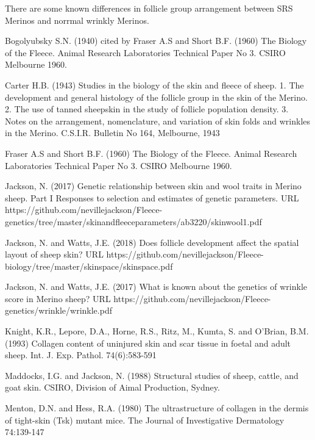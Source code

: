 \documentclass[titlepage]{article}  %
\begin{document}
There are some known differences in follicle group arrangement between SRS Merinos and norrmal wrinkly Merinos. 

\clearpage
\begin{thebibliography}{99}

 Bogolyubsky S.N. (1940) cited by Fraser A.S and Short B.F. (1960) The Biology of the Fleece. Animal Research Laboratories Technical Paper No 3. CSIRO Melbourne 1960.


Carter H.B. (1943) Studies in the biology of the skin and fleece of sheep. 1. The development and general histology of the follicle group in the skin of the Merino. 2. The use of tanned sheepskin in the study of follicle population density. 3. Notes on the arrangement, nomenclature, and variation of skin folds and wrinkles in the Merino. C.S.I.R. Bulletin No 164, Melbourne, 1943

Fraser A.S and Short B.F. (1960) The Biology of the Fleece. Animal Research Laboratories Technical Paper No 3. CSIRO Melbourne 1960.


Jackson, N. (2017) Genetic relationship between skin and wool traits in Merino sheep. Part I Responses to selection and estimates of genetic parameters. URL https://github.com/nevillejackson/Fleece-genetics/tree/master/skinandfleeceparameters/ab3220/skinwool1.pdf

Jackson, N. and Watts, J.E. (2018) Does follicle development affect the spatial layout of sheep skin? URL https://github.com/nevillejackson/Fleece-biology/tree/master/skinspace/skinspace.pdf


Jackson, N. and Watts, J.E. (2017) What is known about the genetics of wrinkle score in Merino sheep? URL https://github.com/nevillejackson/Fleece-genetics/wrinkle/wrinkle.pdf

Knight, K.R., Lepore, D.A., Horne, R.S., Ritz, M., Kumta, S. and O'Brian, B.M. (1993) Collagen content of uninjured skin and scar tissue in foetal and adult sheep. Int. J. Exp. Pathol. 74(6):583-591

Maddocks, I.G. and Jackson, N. (1988) Structural studies of sheep, cattle, and goat skin. CSIRO, Division of Aimal Production, Sydney.

Menton, D.N. and Hess, R.A. (1980) The ultrastructure of collagen in the dermis of tight-skin (Tsk) mutant mice. The Journal of Investigative Dermatology 74:139-147


\end{thebibliography}
\end{document}

